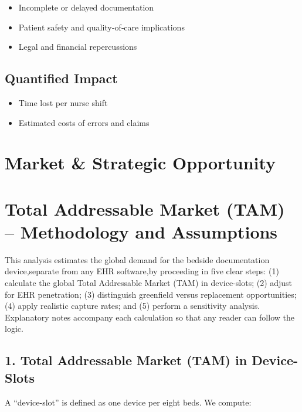 \documentclass[a4paper,11pt]{article}
\begin{document}
\begin{itemize}
  \item Incomplete or delayed documentation
  \item Patient safety and quality‐of‐care implications
  \item Legal and financial repercussions


  
\end{itemize}
\subsection{Quantified Impact}
\begin{itemize}
  \item Time lost per nurse shift
  \item Estimated costs of errors and claims
\end{itemize}

\section{Market \& Strategic Opportunity}

\section{Total Addressable Market (TAM) – Methodology and Assumptions}

This analysis estimates the global demand for the bedside documentation device,separate from any EHR software,by proceeding in five clear steps:  
(1) calculate the global Total Addressable Market (TAM) in device-slots;  
(2) adjust for EHR penetration;  
(3) distinguish greenfield versus replacement opportunities;  
(4) apply realistic capture rates; and  
(5) perform a sensitivity analysis.  
Explanatory notes accompany each calculation so that any reader can follow the logic.

\subsection*{1. Total Addressable Market (TAM) in Device-Slots}

A “device-slot” is defined as one device per eight beds. We compute:
\end{document}
